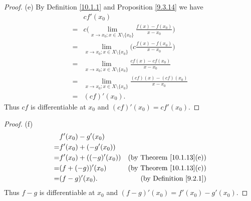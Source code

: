 \begin{proof}{(e)}
    By Definition \ref{10.1.1} and Proposition \ref{9.3.14} we have
    \begin{align*}
          & cf'(x_0)                                                                                 \\
        = & c \bigg(\lim_{x \to x_0 ; x \in X \setminus \{x_0\}} \frac{f(x) - f(x_0)}{x - x_0}\bigg) \\
        = & \lim_{x \to x_0 ; x \in X \setminus \{x_0\}} \bigg(c \frac{f(x) - f(x_0)}{x - x_0}\bigg) \\
        = & \lim_{x \to x_0 ; x \in X \setminus \{x_0\}} \frac{cf(x) - cf(x_0)}{x - x_0}             \\
        = & \lim_{x \to x_0 ; x \in X \setminus \{x_0\}} \frac{(cf)(x) - (cf)(x_0)}{x - x_0}         \\
        = & (cf)'(x_0).
    \end{align*}
    Thus \(cf\) is differentiable at \(x_0\) and \((cf)'(x_0) = cf'(x_0)\).
\end{proof}

\begin{proof}{(f)}
    \begin{align*}
          & f'(x_0) - g'(x_0)                                             \\
        = & f'(x_0) + (-g'(x_0))                                          \\
        = & f'(x_0) + ((-g)'(x_0)) & \text{(by Theorem \ref{10.1.13}(e))} \\
        = & (f + (-g))'(x_0)       & \text{(by Theorem \ref{10.1.13}(c))} \\
        = & (f - g)'(x_0).         & \text{(by Definition \ref{9.2.1})}
    \end{align*}
    Thus \(f - g\) is differentiable at \(x_0\) and \((f - g)'(x_0) = f'(x_0) - g'(x_0)\).
\end{proof}

